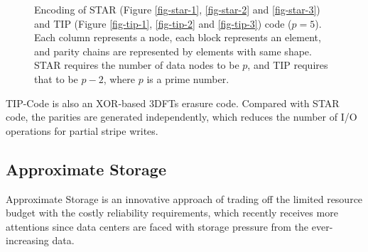 \documentclass[sigconf]{acmart}
\begin{document}
\begin{figure}[!ht]
{}
\vspace{-3mm}
\hspace{5pt}
\vspace{-3mm}
\caption{\small{Encoding of STAR (Figure \ref{fig-star-1}, \ref{fig-star-2} and \ref{fig-star-3}) and TIP (Figure \ref{fig-tip-1}, \ref{fig-tip-2} and \ref{fig-tip-3}) code ($p = 5$). Each column represents a node, each block represents an element, and parity chains are represented by elements with same shape. STAR requires the number of data nodes to be $p$, and TIP requires that to be $p-2$, where $p$ is a prime number.}}
\vspace{-3mm}
\label{fig-star-tip}
\end{figure}

TIP-Code is also an XOR-based 3DFTs erasure code.
Compared with STAR code, the parities are generated independently, which reduces the number of I/O operations for partial stripe writes.

\subsection{Approximate Storage}
Approximate Storage is an innovative approach of trading off the limited resource budget with the costly reliability requirements, which recently receives more attentions since data centers are faced with storage pressure from the ever-increasing data.
\end{document}
